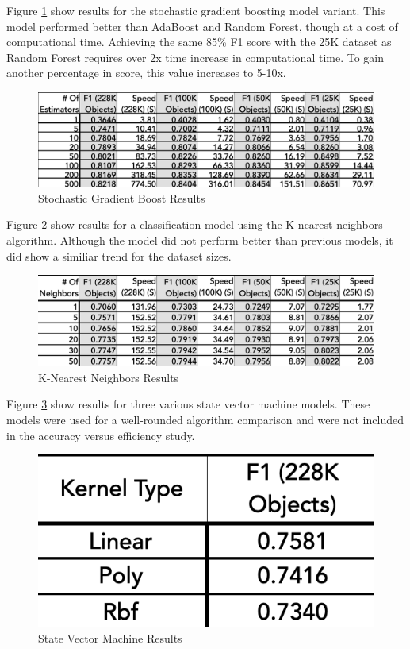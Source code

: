 \documentclass[11pt,sigconf]{acmart}
\begin{document}
Figure \ref{fig:stochasticboost} show results for the stochastic gradient boosting model 
variant. This model performed better than AdaBoost and Random Forest, though at a cost of 
computational time. Achieving the same 85\% F1 score with the 25K dataset as Random Forest 
requires over 2x time increase in computational time. To gain another percentage in score, 
this value increases to 5-10x. 


\begin{figure}[htbp]
  \centering
  \includegraphics[scale=0.35]{stochasticboost}
  \caption{Stochastic Gradient Boost Results}
  \label{fig:stochasticboost}
\end{figure}

Figure \ref{fig:knearestneighbors} show results for a classification model using the 
K-nearest neighbors algorithm. Although the model did not perform better than previous 
models, it did show a similiar trend for the dataset sizes.  


\begin{figure}[htbp]
  \centering
  \includegraphics[scale=0.35]{knearestneighbors}
  \caption{K-Nearest Neighbors Results}
  \label{fig:knearestneighbors}
\end{figure}

Figure \ref{fig:svms} show results for three various state vector machine models. 
These models were used for a well-rounded algorithm comparison and were not 
included in the accuracy versus efficiency study. 

\begin{figure}[htbp]
  \centering
  \includegraphics[scale=0.35]{svms}
  \caption{State Vector Machine Results}
  \label{fig:svms}
\end{figure}
\end{document}
